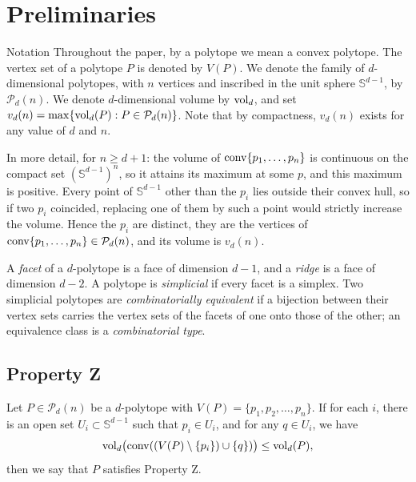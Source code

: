 \section{Preliminaries}
\label{sec:prelim}

\begin{cited}{Notation}{{\cite[Section~1]{horvath-langi-2016}}}
  Throughout the paper, by a polytope we mean a convex polytope. The vertex set
  of a polytope $P$ is denoted by $V(P)$. We denote the family of
  $d$-dimensional polytopes, with $n$ vertices and inscribed in the unit sphere
  $\mathbb{S}^{d-1}$, by $\mathcal{P}_{d}(n)$. We denote $d$-dimensional
  volume by $\operatorname{vol}_{d}$, and set
  $v_{d}(n) = \max\{\operatorname{vol}_{d}(P) : P \in \mathcal{P}_{d}(n)\}$. Note that by
  compactness, $v_{d}(n)$ exists for any value of $d$ and $n$.
\end{cited}

\begin{remark}
  \label{rem:attained}
  In more detail, for $n \geq d+1$: the volume of $\operatorname{conv}\{p_{1}, \ldots, p_{n}\}$
  is continuous on the compact set $(\mathbb{S}^{d-1})^{n}$, so it attains its
  maximum at some $p$, and this maximum is positive. Every point of
  $\mathbb{S}^{d-1}$ other than the $p_{i}$ lies outside their convex hull,
  so if two $p_{i}$ coincided, replacing one of them by such a point would
  strictly increase the volume. Hence the $p_{i}$ are distinct, they are the
  vertices of $\operatorname{conv}\{p_{1}, \ldots, p_{n}\} \in \mathcal{P}_{d}(n)$, and its
  volume is $v_{d}(n)$.
\end{remark}

\begin{definition}
  A \emph{facet} of a $d$-polytope is a face of dimension $d-1$, and a
  \emph{ridge} is a face of dimension $d-2$. A polytope is \emph{simplicial} if
  every facet is a simplex. Two simplicial polytopes are
  \emph{combinatorially equivalent} if a bijection between their vertex sets
  carries the vertex sets of the facets of one onto those of the other; an
  equivalence class is a \emph{combinatorial type}.
\end{definition}

\subsection{Property Z}

\begin{definition}
  \label{def:propertyz}
  Let $P \in \mathcal{P}_{d}(n)$ be a $d$-polytope with
  $V(P) = \{p_{1}, p_{2}, \ldots, p_{n}\}$. If for each $i$, there is an open
  set $U_{i} \subset \mathbb{S}^{d-1}$ such that $p_{i} \in U_{i}$, and for any
  $q \in U_{i}$, we have
  \begin{equation*}
    \operatorname{vol}_{d}\bigl(\operatorname{conv}((V(P) \setminus \{p_{i}\}) \cup \{q\})\bigr)
      \leq \operatorname{vol}_{d}(P),
  \end{equation*}
  then we say that $P$ satisfies Property Z.
\end{definition}

